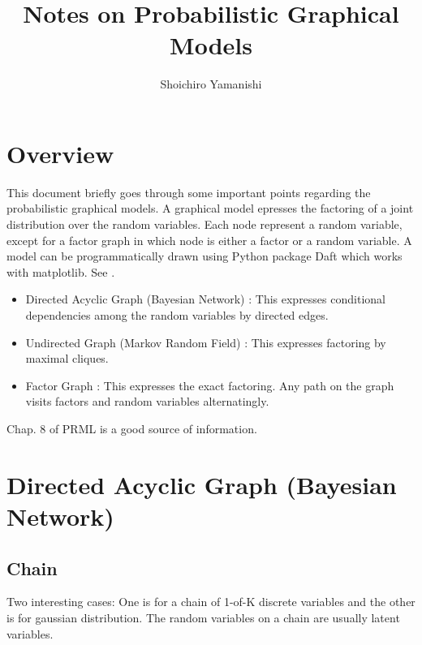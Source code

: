 \documentclass[a4]{article}
\title{ Notes on Probabilistic Graphical Models}
\author{Shoichiro Yamanishi}
\begin{document}
\maketitle



\section{Overview}
This document briefly goes through some important points regarding the probabilistic graphical models.
A graphical model epresses the factoring of a joint distribution over the random variables.
Each node represent a random variable, except for a factor graph in which node is either a factor or a random variable.
A model can be programmatically drawn using Python package Daft which works with matplotlib. See \cite{daft}.

\begin{itemize}
\item Directed Acyclic Graph (Bayesian Network) : This expresses conditional dependencies among the random variables by directed edges.
\item Undirected Graph (Markov Random Field) : This expresses factoring by maximal cliques.
\item Factor Graph : This expresses the exact factoring. Any path on the graph visits factors and random variables alternatingly.
\end{itemize}

Chap.  8 of PRML \cite{bishop2007} is a good source of information.

\section{Directed Acyclic Graph (Bayesian Network)}

\subsection{Chain}
Two interesting cases: One is for a chain of 1-of-K discrete variables and the other is for gaussian distribution.
The random variables on a chain are usually latent variables.
\end{document}
